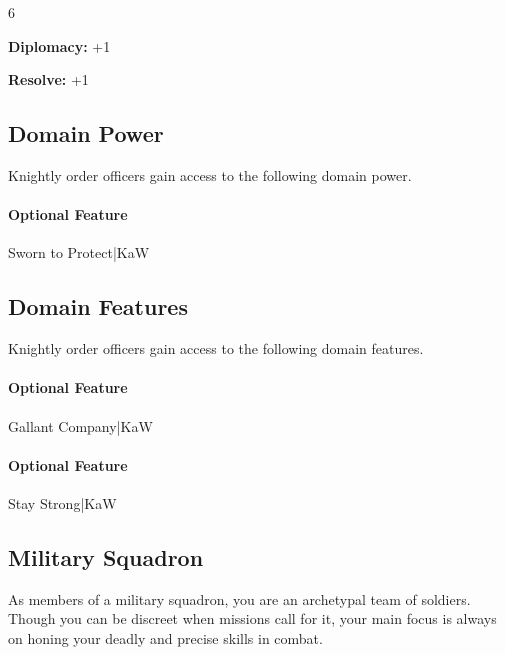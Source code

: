 \documentclass[10pt,a4paper,twoside,bg=print,twocolumn,openany,nodeprecatedcode]{dndbook}
\begin{document}
{\par \vspace { 9pt plus 3pt minus 3pt } \noindent  {} \nopagebreak }

\begin{itemize}
\begin{multicols}{6}
\item \textbf{Diplomacy:} +1
\item \textbf{Resolve:} +1
\end{multicols}

\end{itemize}

\subsection{Domain Power}
Knightly order officers gain access to the following domain power.

\paragraph{Optional Feature}
Sworn to Protect|KaW

\subsection{Domain Features}
Knightly order officers gain access to the following domain features.

\paragraph{Optional Feature}
Gallant Company|KaW

\paragraph{Optional Feature}
Stay Strong|KaW

\subsection{Military Squadron}
As members of a military squadron, you are an archetypal team of soldiers. Though you can be discreet when missions call for it, your main focus is always on honing your deadly and precise skills in combat.

{\par \vspace { 9pt plus 3pt minus 3pt } \noindent  {} \nopagebreak }
\end{document}
